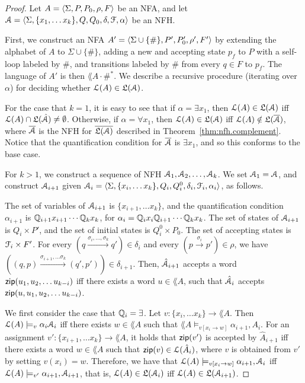 \begin{proof}
Let $A = \langle \Sigma, P, P_0, \rho,F \rangle$ be an NFA, and let $\mathcal{A} = \langle \Sigma, 
\{x_1,\ldots x_k\}, Q, Q_0, \delta, {\cal F},\alpha \rangle$ be an NFH. 

First, we construct an NFA $A'=\langle \Sigma\cup\{\#\}, P', P'_0, \rho', F' \rangle$
by extending the alphabet of $A$ to $\Sigma\cup\{\#\}$, adding a new and 
accepting state $p_f$ to $P$ with a self-loop labeled by $\#$, and transitions 
labeled by $\#$ from every $q\in F$ to $p_f$. 
The language of $A'$ is then $\lang{A}\cdot \#^*$.  
We describe a recursive procedure (iterating over $\alpha$) for deciding 
whether $\mathcal{L}(A)\in\mathfrak{L}(\mathcal{A})$.

For the case that $k=1$, it is easy to see that if $\alpha = \exists x_1$, then 
$\mathcal{L}(A)\in\mathfrak{L}(\mathcal{A})$ iff $\mathcal{L}(A)\cap \mathfrak{L}(\hat{\mathcal{A}}) \neq \emptyset$.
Otherwise, if $\alpha = \forall x_1$, then $\mathcal{L}(A)\in\mathfrak{L}(\mathcal{A})$ iff 
$\mathcal{L}(A)\notin \mathfrak{L}(\overline{\mathcal{A}})$, where $\overline{\mathcal{A}}$ is the NFH for 
$\overline{\mathfrak{L}(\mathcal{A})}$ described in Theorem~\ref{thm:nfh.complement}. 
Notice that the quantification condition for $\overline{\mathcal{A}}$
is $\exists x_1$, and so this conforms to the base case.

For $k>1$, we construct a sequence of NFH $\mathcal{A}_1, \mathcal{A}_2, \ldots, \mathcal{A}_k$. We set 
$\mathcal{A}_1 = \mathcal{A}$, and
construct $\mathcal{A}_{i+1}$ given $\mathcal{A}_i = \langle \Sigma, \{x_i,\ldots x_k\}, Q_i, 
Q^0_i, \delta_i, {\cal F}_i,\alpha_i \rangle$, as follows. 

The set of variables of $\mathcal{A}_{i+1}$ is $\{x_{i+1},\ldots x_k\}$, and the 
quantification condition $\alpha_{i+1}$ is $\mathbb{Q}_{i+1}x_{i+1}\cdots 
\mathbb{Q}_kx_k$, for $\alpha_i = \mathbb{Q}_ix_i \mathbb{Q}_{i+1}\cdots \mathbb{Q}_kx_k$. 
The set of states of $\mathcal{A}_{i+1}$ is $ Q_i\times P'$, and the set of initial 
states is $Q_i^0\times P_0$. The set of accepting states is ${\cal F}_i\times 
F'$.
For every 
$(q\xrightarrow{\sigma_i,\ldots,\sigma_k}q')\in\delta_i$ and every 
$(p\xrightarrow{\sigma_i}p')\in \rho$, we have 
$((q,p)\xrightarrow{\sigma_{i+1},\ldots \sigma_k}(q',p'))\in\delta_{i+1}$. 
Then, $\hat{\mathcal{A}}_{i+1}$ accepts a word $\mathsf{zip}(u_1,u_2,\ldots u_{k-i})$ iff there 
exists a word $u\in \lang{A}$, such that $\hat{\mathcal{A}}_{i}$ accepts 
$\mathsf{zip}(u,u_1,u_2,\ldots u_{k-i})$. 

We first consider the case that $\mathbb{Q}_i = \exists$. 
Let $v:\{x_{i},\ldots x_k\}\rightarrow \lang{A}$.
Then $\mathcal{L}(A)\models _v \alpha_i\mathcal{A}_i$ iff there exists $w\in \lang{A}$ such 
that $\lang{A}\models_{v[x_i\rightarrow w]} \alpha_{i+1},A_i$.
For an assignment $v':\{x_{i+1},\ldots x_k\}\rightarrow \lang{A}$, it holds that 
$\mathsf{zip}(v')$ is accepted by $\hat{A}_{i+1}$ iff there exists a word $w\in 
\lang{A}$ such that $\mathsf{zip}(v)\in\mathcal{L}(\hat{A}_i)$, where $v$ is obtained from $v'$ 
by setting $v(x_i) = w$. 
Therefore, we have that $\mathcal{L}(A)\models_{v[x_i\rightarrow w]}\alpha_{i+1},\mathcal{A}_i$ 
iff $\mathcal{L}(A)\models_{v'} \alpha_{i+1}, \mathcal{A}_{i+1}$, that is, 
$\mathcal{L}(A)\in\mathfrak{L}(\mathcal{A}_i)$ iff $\mathcal{L}(A)\in\mathfrak{L}(\mathcal{A}_{i+1})$. 


\end{proof}
